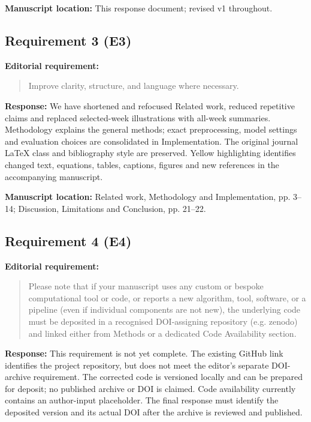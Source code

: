 \documentclass[11pt,a4paper]{article}
\begin{document}
\textbf{Manuscript location:} This response document; revised v1 throughout.
\begin{samepage}
\subsection*{Requirement 3 (E3)}
\textbf{Editorial requirement:}
\begin{quote}\small Improve clarity, structure, and language where necessary.\end{quote}
\end{samepage}
\textbf{Response:}
We have shortened and refocused Related work, reduced repetitive claims and replaced selected-week illustrations with all-week summaries. Methodology explains the general methods; exact preprocessing, model settings and evaluation choices are consolidated in Implementation. The original journal LaTeX class and bibliography style are preserved. Yellow highlighting identifies changed text, equations, tables, captions, figures and new references in the accompanying manuscript.

\textbf{Manuscript location:} Related work, Methodology and Implementation, pp. 3--14; Discussion, Limitations and Conclusion, pp. 21--22.
\begin{samepage}
\subsection*{Requirement 4 (E4)}
\textbf{Editorial requirement:}
\begin{quote}\small Please note that if your manuscript uses any custom or bespoke computational tool or code, or reports a new algorithm, tool, software, or a pipeline (even if individual components are not new), the underlying code must be deposited in a recognised DOI-assigning repository (e.g. zenodo) and linked either from Methods or a dedicated Code Availability section.\end{quote}
\end{samepage}
\textbf{Response:}
This requirement is not yet complete. The existing GitHub link identifies the project repository, but does not meet the editor's separate DOI-archive requirement. The corrected code is versioned locally and can be prepared for deposit; no published archive or DOI is claimed. Code availability currently contains an author-input placeholder. The final response must identify the deposited version and its actual DOI after the archive is reviewed and published.
\end{document}
